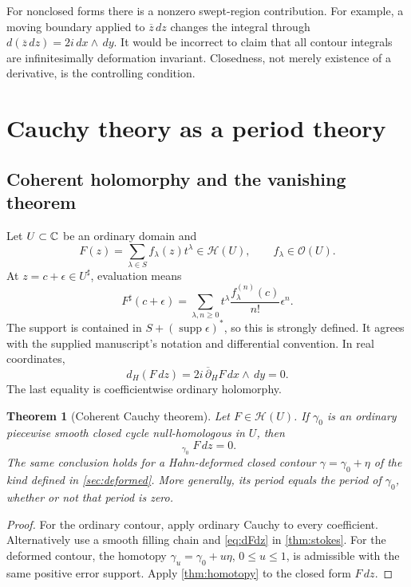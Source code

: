 \documentclass[11pt,letterpaper]{article}
\newtheorem{theorem}{Theorem}[section]
\theoremstyle{definition}
\theoremstyle{remark}
\newcommand{\HH}{\mathcal H}\newcommand{\A}{\mathscr A}\newcommand{\OO}{\mathcal O}
\newcommand{\supp}{\operatorname{supp}}\newcommand{\Res}{\operatorname{Res}}
\newcommand{\HCoint}{\mathop{\oint^{\!H}}\nolimits}
\newcommand{\sh}{^{\sharp}}\newcommand{\dd}{\,d}
\numberwithin{equation}{section}
\begin{document}
For nonclosed forms there is a nonzero swept-region contribution. For example, a moving boundary applied to $\overline z\dd z$ changes the integral through $d(\overline z\dd z)=2i\dd x\wedge\dd y$. It would be incorrect to claim that all contour integrals are infinitesimally deformation invariant. Closedness, not merely existence of a derivative, is the controlling condition.

\section{Cauchy theory as a period theory}\label{sec:cauchy}

\subsection{Coherent holomorphy and the vanishing theorem}
Let $U\subset\mathbb C$ be an ordinary domain and
\[
 F(z)=\sum_{\lambda\in S}f_\lambda(z)t^\lambda\in\HH(U),
 \qquad f_\lambda\in\OO(U).
\]
At $z=c+\epsilon\in U\sh$, evaluation means
\begin{equation}\label{eq:coherentevaluation}
 F\sh(c+\epsilon)=\sum_{\lambda,n\ge0}
 t^\lambda\frac{f_\lambda^{(n)}(c)}{n!}\epsilon^n.
\end{equation}
The support is contained in $S+(\supp\epsilon)^*$, so this is strongly defined. It agrees with the supplied manuscript's notation and differential convention. In real coordinates,
\begin{equation}\label{eq:dFdz}
 d_H(F\dd z)=2i\,\overline\partial_HF\dd x\wedge\dd y=0.
\end{equation}
The last equality is coefficientwise ordinary holomorphy.

\begin{theorem}[Coherent Cauchy theorem]\label{thm:cauchy}
Let $F\in\HH(U)$. If $\gamma_0$ is an ordinary piecewise smooth closed cycle null-homologous in $U$, then
\[
 \HCoint_{\gamma_0}F\dd z=0.
\]
The same conclusion holds for a Hahn-deformed closed contour $\gamma=\gamma_0+\eta$ of the kind defined in \cref{sec:deformed}. More generally, its period equals the period of $\gamma_0$, whether or not that period is zero.
\end{theorem}
\begin{proof}
For the ordinary contour, apply ordinary Cauchy to every coefficient. Alternatively use a smooth filling chain and \eqref{eq:dFdz} in \cref{thm:stokes}. For the deformed contour, the homotopy $\gamma_u=\gamma_0+u\eta$, $0\le u\le1$, is admissible with the same positive error support. Apply \cref{thm:homotopy} to the closed form $F\dd z$.
\end{proof}
\end{document}
